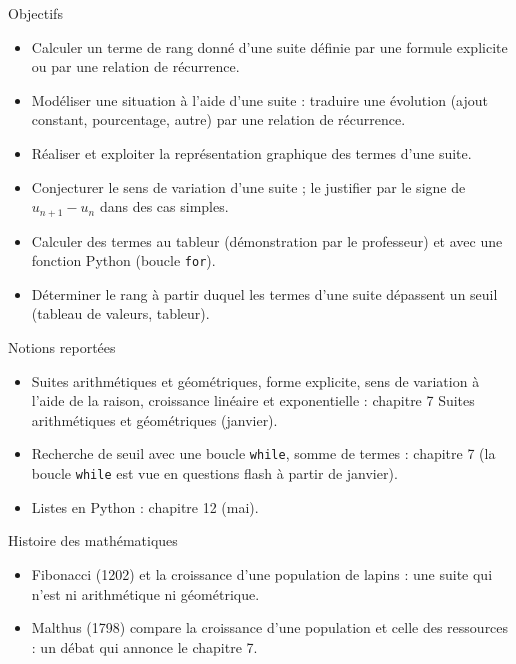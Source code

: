 \documentclass{article}
\theoremstyle{definition}
\begin{document}
\begin{paragraph}{Objectifs}
  \begin{itemize}
    \item Calculer un terme de rang donné d'une suite définie par une formule explicite ou par une relation de récurrence.
    \item Modéliser une situation à l'aide d'une suite : traduire une évolution (ajout constant, pourcentage, autre) par une relation de récurrence.
    \item Réaliser et exploiter la représentation graphique des termes d'une suite.
    \item Conjecturer le sens de variation d'une suite ; le justifier par le signe de $u_{n+1} - u_n$ dans des cas simples.
    \item Calculer des termes au tableur (démonstration par le professeur) et avec une fonction Python (boucle \texttt{for}).
    \item Déterminer le rang à partir duquel les termes d'une suite dépassent un seuil (tableau de valeurs, tableur).
  \end{itemize}
\end{paragraph}

\begin{paragraph}{Notions reportées}
  \begin{itemize}
    \item Suites arithmétiques et géométriques, forme explicite, sens de variation à l'aide de la raison, croissance linéaire et exponentielle : chapitre 7 \og Suites arithmétiques et géométriques \fg{} (janvier).
    \item Recherche de seuil avec une boucle \texttt{while}, somme de termes : chapitre 7 (la boucle \texttt{while} est vue en questions flash à partir de janvier).
    \item Listes en Python : chapitre 12 (mai).
  \end{itemize}
\end{paragraph}

\begin{paragraph}{Histoire des mathématiques}
  \begin{itemize}
    \item Fibonacci (1202) et la croissance d'une population de lapins : une suite qui n'est ni arithmétique ni géométrique.
    \item Malthus (1798) compare la croissance d'une population et celle des ressources : un débat qui annonce le chapitre 7.
  \end{itemize}
\end{paragraph}
\end{document}
